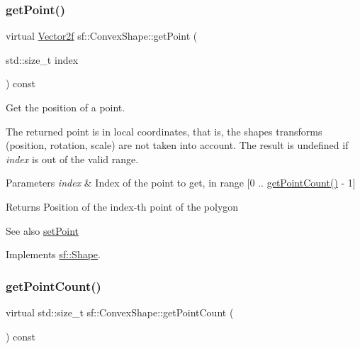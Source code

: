 \subsubsection{\texorpdfstring{getPoint()}{getPoint()}}
{\footnotesize\ttfamily virtual \mbox{\hyperlink{classsf_1_1_vector2}{Vector2f}} sf\+::\+Convex\+Shape\+::get\+Point (\begin{DoxyParamCaption}\item[{std\+::size\+\_\+t}]{index }\end{DoxyParamCaption}) const\hspace{0.3cm}{\ttfamily [virtual]}}



Get the position of a point. 

The returned point is in local coordinates, that is, the shape\textquotesingle{}s transforms (position, rotation, scale) are not taken into account. The result is undefined if {\itshape index} is out of the valid range.


\begin{DoxyParams}{Parameters}
{\em index} & Index of the point to get, in range \mbox{[}0 .. \mbox{\hyperlink{classsf_1_1_convex_shape_a0c54b8d48fe4e13414f6e667dbfc22a3}{get\+Point\+Count()}} -\/ 1\mbox{]}\\
\hline
\end{DoxyParams}
\begin{DoxyReturn}{Returns}
Position of the index-\/th point of the polygon
\end{DoxyReturn}
\begin{DoxySeeAlso}{See also}
\mbox{\hyperlink{classsf_1_1_convex_shape_a5929e0ab0ba5ca1f102b40c234a8e92d}{set\+Point}} \begin{DoxyVerb}\end{DoxyVerb}
 
\end{DoxySeeAlso}


Implements \mbox{\hyperlink{classsf_1_1_shape_a40e5d83713eb9f0c999944cf96458085}{sf\+::\+Shape}}.

\mbox{\label{classsf_1_1_convex_shape_a0c54b8d48fe4e13414f6e667dbfc22a3}} 
\subsubsection{\texorpdfstring{getPointCount()}{getPointCount()}}
{\footnotesize\ttfamily virtual std\+::size\+\_\+t sf\+::\+Convex\+Shape\+::get\+Point\+Count (\begin{DoxyParamCaption}{ }\end{DoxyParamCaption}) const\hspace{0.3cm}{\ttfamily [virtual]}}



